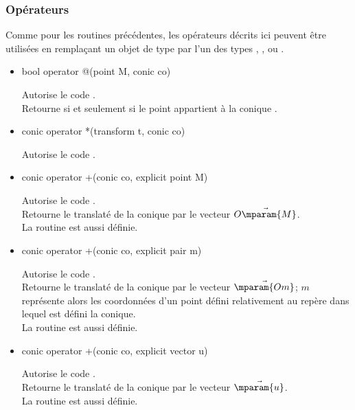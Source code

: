 \documentclass[pdftex]{article}
\newcommand{\ssi}{si et seulement si\xspace}
\begin{document}
\subsubsection{Opérateurs}
Comme pour les routines précédentes, les opérateurs décrits ici peuvent être utilisées en remplaçant un objet
de type  par l'un des types , ,
 ou .
\begin{itemize}
\item {}
  \begin{Vcolor}
    bool operator @(point M, conic co)
  \end{Vcolor}
  Autorise le code .\\
  Retourne  \ssi le point  appartient à la conique .
\item {}
  \begin{Vcolor}
    conic operator *(transform t, conic co)
  \end{Vcolor}
  Autorise le code .
\item {}
  \begin{Vcolor}
    conic operator +(conic co, explicit point M)
  \end{Vcolor}
  Autorise le code .\\
  Retourne le translaté de la conique  par le vecteur
  $\vec{O\mparam{M}}$.\\
  La routine  est aussi définie.
\item {}
  \begin{Vcolor}
    conic operator +(conic co, explicit pair m)
  \end{Vcolor}
  Autorise le code .\\
  Retourne le translaté de la conique  par le vecteur
  $\vec{\mparam{Om}}$; $m$ représente alors les coordonnées d'un point
  défini relativement au repère dans lequel est défini la conique.\\
  La routine  est aussi définie.
\item {}
  \begin{Vcolor}
    conic operator +(conic co, explicit vector u)
  \end{Vcolor}
  Autorise le code .\\
  Retourne le translaté de la conique  par le vecteur
  $\vec{\mparam{u}}$.\\
  La routine  est aussi définie.
\end{itemize}
\end{document}
